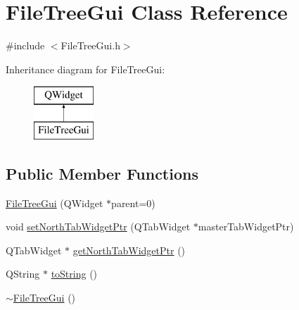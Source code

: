 \hypertarget{class_file_tree_gui}{\section{File\-Tree\-Gui Class Reference}
\label{class_file_tree_gui}
}


{\ttfamily \#include $<$File\-Tree\-Gui.\-h$>$}

Inheritance diagram for File\-Tree\-Gui\-:\begin{figure}[H]
\begin{center}
\leavevmode
\includegraphics[height=2.000000cm]{class_file_tree_gui}
\end{center}
\end{figure}
\subsection*{Public Member Functions}
\begin{DoxyCompactItemize}
\item 
\hyperlink{class_file_tree_gui_acf857f2793adefb176a680d541c24691}{File\-Tree\-Gui} (Q\-Widget $\ast$parent=0)
\item 
void \hyperlink{class_file_tree_gui_a18f7e0f7c76bb92cf164be6005786871}{set\-North\-Tab\-Widget\-Ptr} (Q\-Tab\-Widget $\ast$master\-Tab\-Widget\-Ptr)
\item 
Q\-Tab\-Widget $\ast$ \hyperlink{class_file_tree_gui_a73a0e330ec676df9e822a612b6e2f08e}{get\-North\-Tab\-Widget\-Ptr} ()
\item 
Q\-String $\ast$ \hyperlink{class_file_tree_gui_a58e01f1da920337cf080214c8a82959d}{to\-String} ()
\item 
\hyperlink{class_file_tree_gui_a11cc4baa3a62a625e95155c27a0d7258}{$\sim$\-File\-Tree\-Gui} ()
\end{DoxyCompactItemize}
